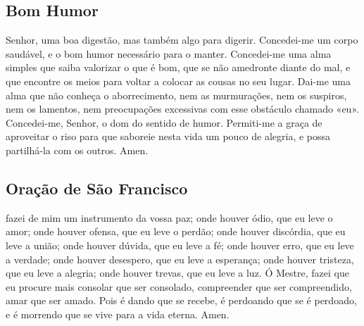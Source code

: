 \subsection{Bom Humor}
 Senhor, uma boa digestão, mas também algo para digerir. Concedei-me um corpo saudável, e o bom humor necessário para o manter. Concedei-me uma alma simples que saiba valorizar o que é bom, que se não amedronte diante do mal, e que encontre os meios para voltar a colocar as cousas no seu lugar. Dai-me uma alma que não conheça o aborrecimento, nem as murmurações, nem os suspiros, nem os lamentos, nem preocupações excessivas com esse obstáculo chamado «eu». Concedei-me, Senhor, o dom do sentido de humor. Permiti-me a graça de aproveitar o riso para que saboreie nesta vida um pouco de alegria, e possa partilhá-la com os outros. Amen.

\subsection{Oração de São Francisco}
 fazei de mim um instrumento da vossa paz; onde houver ódio, que eu leve o amor; onde houver ofensa, que eu leve o perdão; onde houver discórdia, que eu leve a união; onde houver dúvida, que eu leve a fé; onde houver erro, que eu leve a verdade; onde houver desespero, que eu leve a esperança; onde houver tristeza, que eu leve a alegria; onde houver trevas, que eu leve a luz. Ó Mestre, fazei que eu procure mais consolar que ser consolado, compreender que ser compreendido, amar que ser amado. Pois é dando que se recebe, é perdoando que se é perdoado, e é morrendo que se vive para a vida eterna. Amen.

